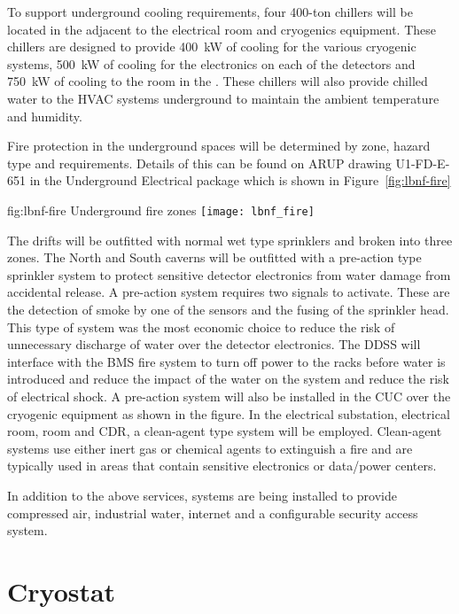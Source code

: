 To support underground cooling requirements, four 400-ton chillers
will be located in the  adjacent to the electrical room and
cryogenics equipment.  These chillers are designed to provide
\SI{400}{\kilo\watt} of cooling for the various cryogenic systems,
\SI{500}{\kilo\watt} of cooling for the electronics on each of the
detectors and \SI{750}{\kilo\watt} of cooling to the  room
in the .  These chillers will also provide chilled water to
the HVAC systems underground to maintain the ambient temperature and
humidity.

Fire protection in the underground spaces will be determined by zone,
hazard type and requirements.  Details of this can be found on ARUP
drawing U1-FD-E-651 in the Underground Electrical package which is shown
in Figure~\ref{fig:lbnf-fire}
\begin{dunefigure}{fig:lbnf-fire}
  {Underground fire zones}
 \texttt{[image: lbnf\_fire]}
\end{dunefigure}
The drifts will be outfitted with normal wet type sprinklers and
broken into three zones.  The North and South caverns will be outfitted
with a pre-action type sprinkler system to protect sensitive detector
electronics from water damage from accidental release.  A pre-action
system requires two signals to activate.  These are the detection of
smoke by one of the sensors and the fusing of the sprinkler
head.  This type of system was the most economic choice to reduce the
risk of unnecessary discharge of water over the detector electronics.
The DDSS will interface with the BMS fire system to turn off power
to the racks before water is introduced and reduce the impact of
the water on the system and reduce the risk of electrical shock.  A
pre-action system will also be installed in the CUC over the cryogenic
equipment as shown in the figure.  In the electrical substation,
electrical room,  room and CDR, a clean-agent type system will be
employed.  Clean-agent systems use either inert gas or chemical agents
to extinguish a fire and are typically used in areas that contain
sensitive electronics or data/power centers.

In addition to the above services, systems are being installed to
provide compressed air, industrial water, internet and a configurable
security access system.

\section{Cryostat}
\label{sec:fdsp-coord-cryostat}


